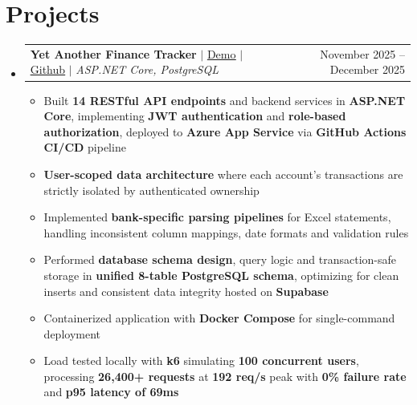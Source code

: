 \documentclass[letterpaper,11pt]{article}
\makeatletter
\newcommand{\resumeItem}[1]{
  \item\small{
    {#1 \vspace{-2pt}}
  }
}
\newcommand{\resumeSubheading}[4]{
  \vspace{-2pt}\item
    \begin{tabular*}{0.97\textwidth}[t]{l@{\extracolsep{\fill}}r}
      \textbf{#1} & #2 \\
      \textit{\small#3} & \textit{\small #4} \\
    \end{tabular*}\vspace{-7pt}
}
\newcommand{\resumeSubSubheading}[2]{
    \item
    \begin{tabular*}{0.97\textwidth}{l@{\extracolsep{\fill}}r}
      \textit{\small#1} & \textit{\small #2} \\
    \end{tabular*}\vspace{-7pt}
}
\newcommand{\resumeProjectHeading}[2]{
    \item
    \begin{tabular*}{0.97\textwidth}{l@{\extracolsep{\fill}}r}
      \small#1 & #2 \\
    \end{tabular*}\vspace{-7pt}
}
\newcommand{\resumeSubHeadingListStart}{\begin{itemize}[leftmargin=0.15in, label={}]}
\newcommand{\resumeSubHeadingListEnd}{\end{itemize}}
\newcommand{\resumeItemListStart}{\begin{itemize}}
\newcommand{\resumeItemListEnd}{\end{itemize}\vspace{-5pt}}
\makeatother
\begin{document}




\section{Projects}
    \resumeSubHeadingListStart
      \resumeProjectHeading
          {\textbf{Yet Another Finance Tracker} $|$ \href{https://yaftapp.netlify.app}{\underline{Demo}} $|$ \href{https://github.com/berat-berber/yaft}{\underline{Github}} $|$ \emph{ASP.NET Core, PostgreSQL}}{November 2025 -- December 2025}
          \resumeItemListStart
            \resumeItem{Built \textbf{14 RESTful API endpoints} and backend services in \textbf{ASP.NET Core}, implementing \textbf{JWT authentication} and \textbf{role-based authorization}, deployed to \textbf{Azure App Service} via \textbf{GitHub Actions CI/CD} pipeline}
            \resumeItem{\textbf{User-scoped data architecture} where each account's transactions are strictly isolated by authenticated ownership}
            \resumeItem{Implemented \textbf{bank-specific parsing pipelines} for Excel statements, handling inconsistent column mappings, date formats and validation rules}
            \resumeItem{
            Performed \textbf{database schema design}, query logic and transaction-safe storage in \textbf{unified 8-table PostgreSQL schema}, optimizing for clean inserts and consistent data integrity hosted on \textbf{Supabase}}
            \resumeItem{
            Containerized application with \textbf{Docker Compose} for single-command deployment}
            \resumeItem{
            Load tested locally with \textbf{k6} simulating \textbf{100 concurrent users}, processing \textbf{26,400+ requests} at \textbf{192 req/s} peak with \textbf{0\% failure rate} and \textbf{p95 latency of 69ms}
            }
            \resumeItemListEnd
    \resumeSubHeadingListEnd
\end{document}
